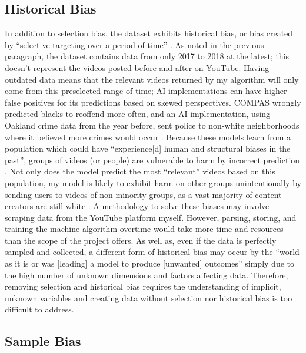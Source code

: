 \documentclass[10pt,twocolumn]{article}
\begin{document}
\subsection {Historical Bias}

In addition to selection bias, the dataset exhibits historical bias, or bias created by “selective targeting over a period of time” \cite{Fuchs2018}. As noted in the previous paragraph, the dataset contains data from only 2017 to 2018 at the latest; this doesn’t represent the videos posted before and after on YouTube. Having outdated data means that the relevant videos returned by my algorithm will only come from this preselected range of time; AI implementations can have higher false positives for its predictions based on skewed perspectives. COMPAS wrongly predicted blacks to reoffend more often, and an AI implementation, using Oakland crime data from the year before, sent police to non-white neighborhoods where it believed more crimes would occur \cite{fairness2017}. Because these models learn from a population which could have “experience[d] human and structural biases in the past”, groups of videos (or people) are vulnerable to harm by incorrect prediction \cite{Rajkomar2018}. Not only does the model predict the most “relevant” videos based on this population, my model is likely to exhibit harm on other groups unintentionally by sending users to videos of non-minority groups, as a vast majority of content creators are still white \cite{Zippia2021}. A methodology to solve these biases may involve scraping data from the YouTube platform myself. However, parsing, storing, and training the machine algorithm overtime would take more time and resources than the scope of the project offers. As well as, even if the data is perfectly sampled and collected, a different form of historical bias may occur by the “world as it is or was [leading] a model to produce [unwanted] outcomes” \cite{Hellstrom2020} simply due to the high number of unknown dimensions and factors affecting data. Therefore, removing selection and historical bias requires the understanding of implicit, unknown variables and creating data without selection nor historical bias is too difficult to address.

\subsection {Sample Bias}
\end{document}
